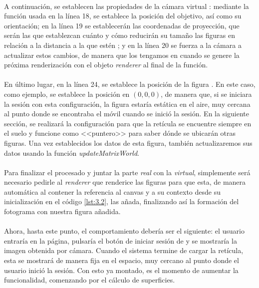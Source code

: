 \documentclass{subfiles}
\begin{document}
        \paragraph{}
        A continuación, se establecen las propiedades de la cámara virtual \cite{web:threejs_perspectivecamera}: mediante la función usada en la línea 18, se establece la posición del objetivo, así como su orientación; en la línea 19 se establecerán las coordenadas de proyección, que serán las que establezcan cuánto y cómo reducirán su tamaño las figuras en relación a la distancia a la que estén \cite{web:mozilla_xrview}; y en la línea 20 se fuerza a la cámara a actualizar estos cambios, de manera que los tengamos en cuando se genere la próxima renderización con el objeto \textit{renderer} al final de la función.

        \paragraph{}
        En último lugar, en la línea 24, se establece la posición de la figura \cite{web:threejs_object3d}. En este caso, como ejemplo, se establece la posición en $(0, 0, 0)$, de manera que, si se iniciara la sesión con esta configuración, la figura estaría estática en el aire, muy cercana al punto donde se encontraba el móvil cuando se inició la sesión. En la siguiente sección, se realizará la configuración para que la retícula se encuentre siempre en el suelo y funcione como <<puntero>> para saber dónde se ubicarán otras figuras. Una vez establecidos los datos de esta figura, también actualizaremos sus datos usando la función \textit{updateMatrixWorld}.

        \paragraph{}
        Para finalizar el procesado y juntar la parte \textit{real} con la \textit{virtual}, simplemente será necesario pedirle al \textit{renderer} que renderice las figuras \cite{web:threejs_webglrenderer} para que esta, de manera automática al contener la referencia al canvas y a su contexto desde su inicialización en el código \ref{lst:3.2}, las añada, finalizando así la formación del fotograma con nuestra figura añadida.

        \paragraph{}
        Ahora, hasta este punto, el comportamiento debería ser el siguiente: el usuario entraría en la página, pulsaría el botón de iniciar sesión de \ra y se mostraría la imagen obtenida por cámara. Cuando el sistema termine de cargar la retícula, esta se mostrará de manera fija en el espacio, muy cercano al punto donde el usuario inició la sesión. Con esto ya montado, es el momento de aumentar la funcionalidad, comenzando por el cálculo de superficies.
\end{document}

